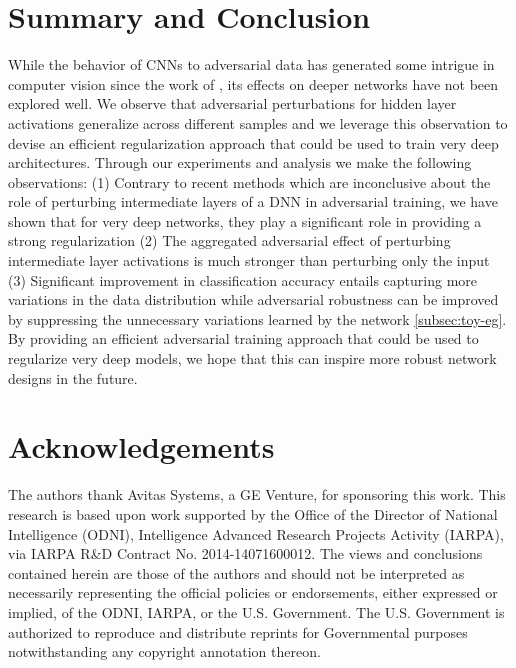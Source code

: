 \documentclass[letterpaper]{article} %
\begin{document}

\section{Summary and Conclusion}\label{sec:conclusion}
While the behavior of CNNs to adversarial data has generated some intrigue in computer vision since the work of \cite{szegedy2013intriguing}, its effects on deeper networks have not been explored well. We observe that adversarial perturbations for hidden layer activations generalize across different samples and we leverage this observation to devise an efficient regularization approach that could be used to train very deep architectures.  Through our experiments and analysis we make the following observations: (1) Contrary to recent methods which are inconclusive about the role of perturbing intermediate layers of a DNN in adversarial training, we have shown that for very deep networks, they play a significant role in providing a strong regularization (2) The aggregated adversarial effect of perturbing intermediate layer activations is much stronger than perturbing only the input (3) Significant improvement in classification accuracy entails capturing more variations in the data distribution while adversarial robustness can be improved by suppressing the unnecessary variations learned by the network \ref{subsec:toy-eg}. By providing an efficient adversarial training approach that could be used to regularize very deep models, we hope that this can inspire more robust network designs in the future. 

\section{Acknowledgements}
The authors thank Avitas Systems, a GE Venture, for sponsoring this work. This research is based upon work supported by the Office of the Director of National Intelligence (ODNI), Intelligence
Advanced Research Projects Activity (IARPA), via IARPA R\&D Contract No. 2014-14071600012. The
views and conclusions contained herein are those of the authors and should not be interpreted as necessarily representing the official policies or endorsements, either expressed or implied, of the ODNI, IARPA, or the U.S. Government. The U.S. Government is authorized to reproduce and distribute reprints for Governmental purposes notwithstanding any copyright annotation thereon.




\end{document}
